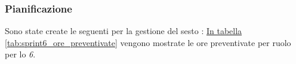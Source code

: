 \subsubsection{Pianificazione}
\label{sec:sprint6_pianificazione}
Sono state create le seguenti  per la gestione del sesto : 
\hyperref[tab:sprint6_ore_preventivate]{In tabella \ref{tab:sprint6_ore_preventivate}} vengono mostrate le ore preventivate per ruolo per lo \textit{ 6}.

\begin{table}[H]
    \centering
    \caption{Ore preventivate per ruolo Sprint 6}
    \label{tab:sprint6_ore_preventivate}
\end{table}